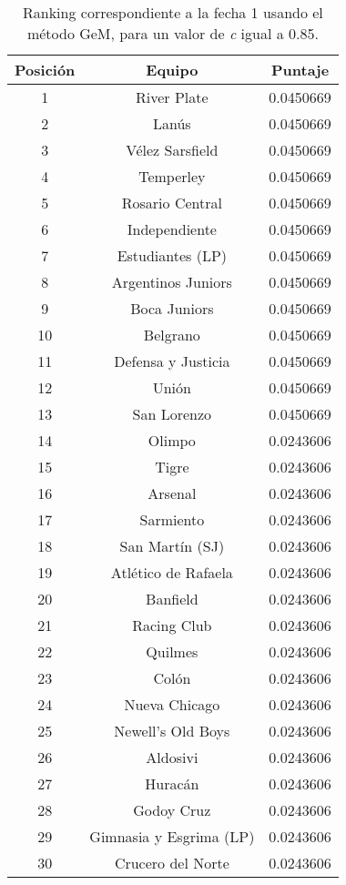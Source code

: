 \begin{table}
	\center
	\begin{tabular}{| c | c | c |}
	  	\hline
	  	Posición & Equipo & Puntaje \\ \hline \hline
		1 & River Plate & 0.0450669 \\ \hline
		2 & Lanús & 0.0450669 \\ \hline
		3 & Vélez Sarsfield & 0.0450669 \\ \hline
		4 & Temperley & 0.0450669 \\ \hline
		5 & Rosario Central & 0.0450669 \\ \hline
		6 & Independiente & 0.0450669 \\ \hline
		7 & Estudiantes (LP) & 0.0450669 \\ \hline
		8 & Argentinos Juniors & 0.0450669 \\ \hline
		9 & Boca Juniors & 0.0450669 \\ \hline
		10 & Belgrano & 0.0450669 \\ \hline
		11 & Defensa y Justicia & 0.0450669 \\ \hline
		12 & Unión & 0.0450669 \\ \hline
		13 & San Lorenzo & 0.0450669 \\ \hline
		14 & Olimpo & 0.0243606 \\ \hline
		15 & Tigre & 0.0243606 \\ \hline
		16 & Arsenal & 0.0243606 \\ \hline
		17 & Sarmiento & 0.0243606 \\ \hline
		18 & San Martín (SJ) & 0.0243606 \\ \hline
		19 & Atlético de Rafaela & 0.0243606 \\ \hline
		20 & Banfield & 0.0243606 \\ \hline
		21 & Racing Club & 0.0243606 \\ \hline
		22 & Quilmes & 0.0243606 \\ \hline
		23 & Colón & 0.0243606 \\ \hline
		24 & Nueva Chicago & 0.0243606 \\ \hline
		25 & Newell's Old Boys & 0.0243606 \\ \hline
		26 & Aldosivi & 0.0243606 \\ \hline
		27 & Huracán & 0.0243606 \\ \hline
		28 & Godoy Cruz & 0.0243606 \\ \hline
		29 & Gimnasia y Esgrima (LP) & 0.0243606 \\ \hline
		30 & Crucero del Norte & 0.0243606 \\ \hline
	\end{tabular}
	\caption{\footnotesize Ranking correspondiente a la fecha 1 usando el método GeM, para un valor de \emph{c} igual a 0.85.}
\end{table}

